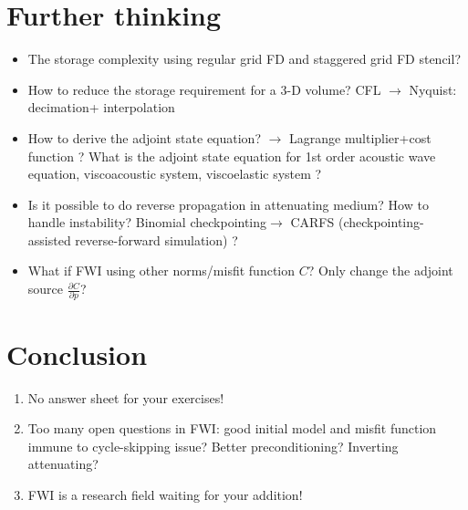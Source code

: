\section{Further thinking}
\begin{itemize}
 \item The storage complexity using regular grid FD and staggered grid FD stencil?
 \item How to reduce the storage requirement for a 3-D volume? CFL $\rightarrow$ Nyquist: decimation+ interpolation \citep{Yang_2016_DPI,Yang_2016_WRB}
 \item How to derive the adjoint state equation? $\rightarrow$ Lagrange multiplier+cost function \citep{Plessix_2006_RAS}? What is the adjoint state equation for 1st order acoustic wave equation, viscoacoustic system, viscoelastic system \citep{Yang_2016_SFM}?
 \item Is it possible to do reverse propagation in attenuating medium? How to handle instability? Binomial checkpointing$\rightarrow$ CARFS (checkpointing-assisted reverse-forward simulation) \citep{Yang_2016_CAR}?
 \item What if FWI using other norms/misfit function $C$? Only change the adjoint source $\frac{\partial C}{\partial p}$?
\end{itemize}

\section{Conclusion}
\begin{enumerate}
 \item No answer sheet for your exercises!
 
 \item Too many open questions in FWI: good initial model and misfit function immune to cycle-skipping issue? Better preconditioning? Inverting attenuating?
 
 \item FWI is a research field waiting for your addition! 

\end{enumerate}





